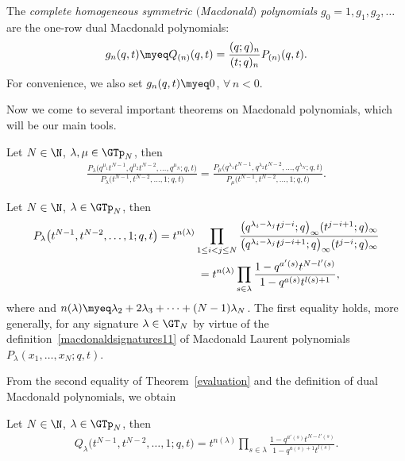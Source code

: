 The \textit{complete homogeneous symmetric $($Macdonald$)$ polynomials} $g_0 = 1, g_1, g_2, \dots$ are the one-row dual Macdonald polynomials:
\begin{gather}\label{gtoQ}
g_n(q, t) \myeq Q_{(n)}(q, t) = \frac{(q; q)_n}{(t; q)_n}P_{(n)}(q, t).
\end{gather}
For convenience, we also set $g_n(q, t) \myeq 0$, $\forall\, n < 0$.

Now we come to several important theorems on Macdonald polynomials, which will be our main tools.

\begin{thm}\label{symmetry}
Let $N\in\N$, $\lambda, \mu\in\GTp_N$, then
\begin{gather*}
\frac{P_{\lambda}\big(q^{\mu_1}t^{N-1}, q^{\mu_2}t^{N-2}, \dots, q^{\mu_N}; q, t\big)}{P_{\lambda}\big(t^{N-1}, t^{N-2}, \dots, 1; q, t\big)} = \frac{P_{\mu}\big(q^{\lambda_1}t^{N-1}, q^{\lambda_2}t^{N-2}, \dots, q^{\lambda_N}; q, t\big)}{P_{\mu}\big(t^{N-1}, t^{N-2}, \dots, 1; q, t\big)}.
\end{gather*}
\end{thm}

\begin{thm}\label{evaluation}
Let $N\in\N$, $\lambda\in\GTp_N$, then
\begin{gather*}
P_{\lambda}\big(t^{N-1}, t^{N-2}, \dots, 1; q, t\big) = t^{n(\lambda)}\prod_{1\leq i<j\leq N}{\frac{\big(q^{\lambda_i - \lambda_j}t^{j-i}; q\big)_{\infty}(t^{j-i+1}; q)_{\infty} }{ \big(q^{\lambda_i - \lambda_j}t^{j-i+1}; q\big)_{\infty} (t^{j-i}; q)_{\infty}}}\\
\hphantom{P_{\lambda}\big(t^{N-1}, t^{N-2}, \dots, 1; q, t\big)}{} = t^{n(\lambda)}\prod_{s\in\lambda}{\frac{1 - q^{a'(s)}t^{N - l'(s)}}{1 - q^{a(s)}t^{l(s)+1}}},
\end{gather*}
where and $n(\lambda) \myeq \lambda_2 + 2\lambda_3 + \cdots + (N-1)\lambda_N$.
The first equality holds, more generally, for any signature $\lambda\in\GT_N$ by virtue of the definition~\eqref{macdonaldsignatures11} of Macdonald Laurent polynomials $P_{\lambda}(x_1, \dots, x_N; q, t)$.
\end{thm}

From the second equality of Theorem~\ref{evaluation} and the def\/inition of dual Macdonald polynomials, we obtain

\begin{cor}\label{evaluationcor}
Let $N\in\N$, $\lambda\in\GTp_N$, then
\begin{gather*}
Q_{\lambda}\big(t^{N-1}, t^{N-2}, \dots, 1; q, t\big) = t^{n(\lambda)}\prod_{s\in\lambda}{\frac{1 - q^{a'(s)}t^{N - l'(s)}}{1 - q^{a(s)+1}t^{l(s)}}}.
\end{gather*}
\end{cor}

